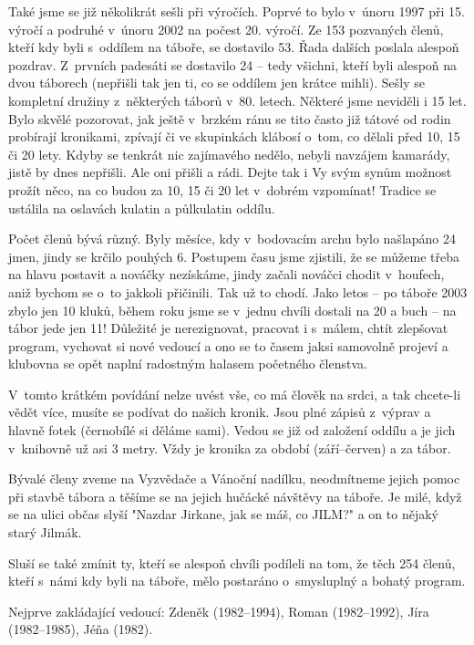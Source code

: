 \documentclass[a5paper, 11pt, twoside]{article}
\begin{document}
Také jsme se již několikrát sešli při výročích. Poprvé to bylo v~únoru
1997 při 15. výročí a podruhé v~únoru 2002 na počest 20. výročí. Ze 153
pozvaných členů, kteří kdy byli s~oddílem na táboře, se dostavilo 53.
Řada dalších poslala alespoň pozdrav. Z~prvních padesáti se dostavilo 24
-- tedy všichni, kteří byli alespoň na dvou táborech (nepřišli tak jen
ti, co se oddílem jen krátce mihli). Sešly se kompletní družiny
z~některých táborů v~80. letech. Některé jsme neviděli i 15 let. Bylo
skvělé pozorovat, jak ještě v~brzkém ránu se tito často již tátové od
rodin probírají kronikami, zpívají či ve skupinkách klábosí o~tom, co
dělali před 10, 15 či 20 lety. Kdyby se tenkrát nic zajímavého nedělo,
nebyli navzájem kamarády, jistě by dnes nepřišli. Ale oni přišli a rádi.
Dejte tak i Vy svým synům možnost prožít něco, na co budou za 10, 15 či
20 let v~dobrém vzpomínat! Tradice se ustálila na oslavách kulatin a
půlkulatin oddílu.

Počet členů bývá různý. Byly měsíce, kdy v~bodovacím archu bylo
našlapáno 24 jmen, jindy se krčilo pouhých 6. Postupem času jsme
zjistili, že se můžeme třeba na hlavu postavit a nováčky nezískáme,
jindy začali nováčci chodit v~houfech, aniž bychom se o~to jakkoli
přičinili. Tak už to chodí. Jako letos -- po táboře 2003 zbylo jen 10
kluků, během roku jsme se v~jednu chvíli dostali na 20 a buch -- na
tábor jede jen 11! Důležité je nerezignovat, pracovat i s~málem, chtít
zlepšovat program, vychovat si nové vedoucí a ono se to časem jaksi
samovolně projeví a klubovna se opět naplní radostným halasem početného
členstva.

V~tomto krátkém povídání nelze uvést vše, co má člověk na srdci, a tak
chcete-li vědět více, musíte se podívat do našich kronik. Jsou plné
zápisů z~výprav a hlavně fotek (černobílé si děláme sami). Vedou se již
od založení oddílu a je jich v~knihovně už asi 3 metry. Vždy je kronika
za období (září--červen) a za tábor.

Bývalé členy zveme na Vyzvědače a Vánoční nadílku, neodmítneme jejich
pomoc při stavbě tábora a těšíme se na jejich hučácké návštěvy na
táboře. Je milé, když se na ulici občas slyší "Nazdar Jirkane, jak se
máš, co JILM?" a on to nějaký starý Jilmák.

Sluší se také zmínit ty, kteří se alespoň chvíli podíleli na tom, že
těch 254 členů, kteří s~námi kdy byli na táboře, mělo postaráno
o~smysluplný a bohatý program.

Nejprve zakládající vedoucí: \mbox{Zdeněk}
(1982--1994), \mbox{Roman} (1982--1992), \mbox{Jíra} (1982--1985), \mbox{Jéňa} (1982). 
\end{document}
